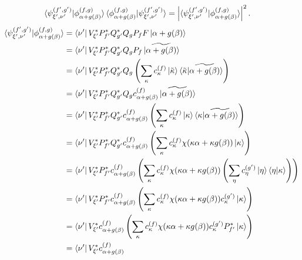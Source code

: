 \documentclass[a4paper]{article}
\begin{document}
  \begin{align}
    \braket{
      \psi_{\xi',\nu'}^{(f',g')}
      |\phi_{\alpha + g(\beta)}^{(f,g)}
    }
    \braket{
      \phi_{\alpha + g(\beta)}^{(f,g)}
      |\psi_{\xi',\nu'}^{(f',g')}
    }
    &= \left|
    \braket{
      \psi_{\xi',\nu'}^{(f',g')}
      |\phi_{\alpha + g(\beta)}^{(f,g)}
    }
    \right|^2.
  \end{align}
  \begin{align}
    \braket{
      \psi_{\xi',\nu'}^{(f',g')}
      |\phi_{\alpha + g(\beta)}^{(f,g)}
    }
    &= \bra{\nu'}V_{\xi'}^* P_{f'}^* Q_{g'}^*
    Q_g P_f F \ket{\alpha + g(\beta)} \\
    &= \bra{\nu'}V_{\xi'}^* P_{f'}^* Q_{g'}^*
    Q_g P_f \ket{\widetilde{\alpha + g(\beta)}} \\
    &= \bra{\nu'}V_{\xi'}^* P_{f'}^* Q_{g'}^*
    Q_g \left(
      \sum_{\kappa}^{} c_{\kappa}^{(f)}
      \ket{\tilde \kappa}
      \braket{\tilde \kappa|
      \widetilde{\alpha+g(\beta)}}
    \right) \\
    &= \bra{\nu'}V_{\xi'}^* P_{f'}^* Q_{g'}^*
    Q_g c_{\alpha+g(\beta)}^{(f)}
      \ket{\widetilde{\alpha+g(\beta)}} \\
    &= \bra{\nu'}V_{\xi'}^* P_{f'}^* Q_{g'}^*
    c_{\alpha+g(\beta)}^{(f)}
    \left(
      \sum_{\kappa}^{} c_{\kappa}^{(f)} \ket\kappa
      \braket{\kappa|\widetilde{\alpha+g(\beta)}}
    \right) \\
    &= \bra{\nu'}V_{\xi'}^* P_{f'}^* Q_{g'}^*
    c_{\alpha+g(\beta)}^{(f)}
    \left(
      \sum_{\kappa}^{} c_{\kappa}^{(f)}
      \chi(\kappa\alpha + \kappa g(\beta))
      \ket\kappa
    \right) \\
    &= \bra{\nu'}V_{\xi'}^* P_{f'}^* 
    c_{\alpha+g(\beta)}^{(f)}
    \left(
      \sum_{\kappa}^{} c_{\kappa}^{(f)}
      \chi(\kappa\alpha + \kappa g(\beta))
      \left(
        \sum_{\eta}^{} c_{\eta}^{(g')}
        \ket\eta\braket{\eta|\kappa}
      \right) 
    \right) \\
    &= \bra{\nu'}V_{\xi'}^* P_{f'}^* 
    c_{\alpha+g(\beta)}^{(f)}
    \left(
      \sum_{\kappa}^{} c_{\kappa}^{(f)}
      \chi(\kappa\alpha + \kappa g(\beta))
      c_{\kappa}^{(g')} \ket\kappa 
    \right) \\
    &= \bra{\nu'}V_{\xi'}^*  
    c_{\alpha+g(\beta)}^{(f)}
    \left(
      \sum_{\kappa}^{} c_{\kappa}^{(f)}
      \chi(\kappa\alpha + \kappa g(\beta))
      c_{\kappa}^{(g')} P_{f'}^* \ket\kappa 
    \right) \\
    &= \bra{\nu'}V_{\xi'}^*  
    c_{\alpha+g(\beta)}^{(f)}

\end{align}
\end{document}
